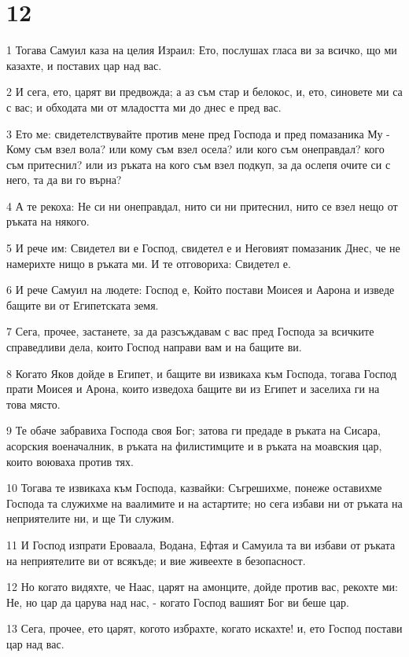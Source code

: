 \chapter{12}

\par 1 Тогава Самуил каза на целия Израил: Ето, послушах гласа ви за всичко, що ми казахте, и поставих цар над вас.
\par 2 И сега, ето, царят ви предвожда; а аз съм стар и белокос, и, ето, синовете ми са с вас; и обходата ми от младостта ми до днес е пред вас.
\par 3 Ето ме: свидетелствувайте против мене пред Господа и пред помазаника Му - Кому съм взел вола? или кому съм взел осела? или кого съм онеправдал? кого съм притеснил? или из ръката на кого съм взел подкуп, за да ослепя очите си с него, та да ви го върна?
\par 4 А те рекоха: Не си ни онеправдал, нито си ни притеснил, нито се взел нещо от ръката на някого.
\par 5 И рече им: Свидетел ви е Господ, свидетел е и Неговият помазаник Днес, че не намерихте нищо в ръката ми. И те отговориха: Свидетел е.
\par 6 И рече Самуил на людете: Господ е, Който постави Моисея и Аарона и изведе бащите ви от Египетската земя.
\par 7 Сега, прочее, застанете, за да разсъждавам с вас пред Господа за всичките справедливи дела, които Господ направи вам и на бащите ви.
\par 8 Когато Яков дойде в Египет, и бащите ви извикаха към Господа, тогава Господ прати Моисея и Арона, които изведоха бащите ви из Египет и заселиха ги на това място.
\par 9 Те обаче забравиха Господа своя Бог; затова ги предаде в ръката на Сисара, асорския военачалник, в ръката на филистимците и в ръката на моавския цар, които воюваха против тях.
\par 10 Тогава те извикаха към Господа, казвайки: Съгрешихме, понеже оставихме Господа та служихме на ваалимите и на астартите; но сега избави ни от ръката на неприятелите ни, и ще Ти служим.
\par 11 И Господ изпрати Ероваала, Водана, Ефтая и Самуила та ви избави от ръката на неприятелите ви от всякъде; и вие живеехте в безопасност.
\par 12 Но когато видяхте, че Наас, царят на амонците, дойде против вас, рекохте ми: Не, но цар да царува над нас, - когато Господ вашият Бог ви беше цар.
\par 13 Сега, прочее, ето царят, когото избрахте, когато искахте! и, ето Господ постави цар над вас.
